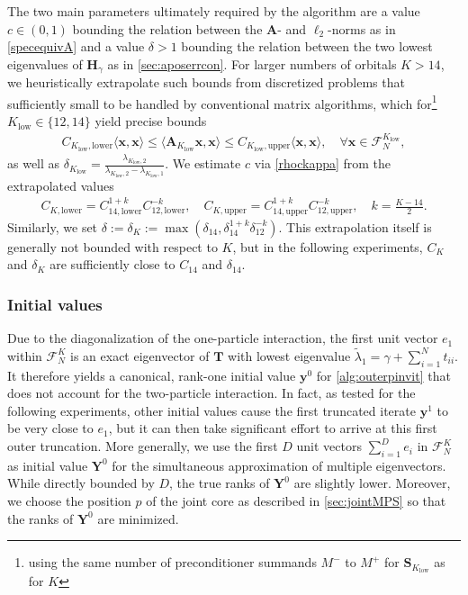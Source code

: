 \documentclass[a4paper,11pt,oneside]{amsart}
\theoremstyle{definition}
\theoremstyle{remark}
\newcommand{\A}{\ten A}
\newcommand{\ten}[1]{\boldsymbol{#1}}
\numberwithin{equation}{section}
\numberwithin{theorem}{section}
\begin{document}
The two main parameters ultimately required by the algorithm are a value $c \in (0,1)$ bounding the relation between the $\A$- and $\ell_2$-norms as in \cref{specequivA} and a value $\delta > 1$ bounding the relation between the two lowest eigenvalues of $\ten H_\gamma$ as in \cref{sec:aposerrcon}. For larger numbers of orbitals $K > 14$, we heuristically extrapolate such bounds from discretized problems that sufficiently small to be handled by conventional matrix algorithms, which for\footnote{using the same number of preconditioner summands $M^-$ to $M^+$ for $\ten S_{K_{\mathrm{low}}}$ as for $K$} $K_{\mathrm{low}} \in \{12,14\}$ yield precise bounds
\begin{align*}
  C_{K_{\mathrm{low}},\mathrm{lower}} \langle   \ten x,  \ten x \rangle
   \leq \langle \A_{K_{\mathrm{low}}}  \ten x , \ten x \rangle 	\leq 
   C_{{K_{\mathrm{low}}},\mathrm{upper}} \langle  \ten x,  \ten x \rangle, \quad \forall \ten x \in \mathcal{F}_N^{K_{\mathrm{low}}},
\end{align*}
as well as $\delta_{K_{\mathrm{low}}} = \frac{\lambda_{{K_{\mathrm{low}}},2}}{\lambda_{{K_{\mathrm{low}}},2} - \lambda_{{K_{\mathrm{low}}},1}}$. We estimate $c$ via \cref{rhockappa} from the extrapolated values
%
%
\begin{align*}
 C_{K,\mathrm{lower}} = C_{14,\mathrm{lower}}^{1+k}  C_{12,\mathrm{lower}}^{-k}, \quad
 C_{K,\mathrm{upper}} = C_{14,\mathrm{upper}}^{1+k} C_{12,\mathrm{upper}}^{-k}, \quad k = \frac{K - 14}{2}.
\end{align*}
Similarly, we set $\delta := \delta_K := \max(\delta_{14},\delta_{14}^{1+k}  \delta_{12}^{-k})$. This extrapolation itself is generally not bounded with respect to $K$, but in the following experiments, $C_{K}$ and $\delta_K$ are sufficiently close to $C_{14}$ and $\delta_{14}$.
%


\subsubsection{Initial values}\label{sec:initvalues}

Due to the diagonalization of the one-particle interaction, the first unit vector $e_1$ within $\mathcal{F}_N^K$ is an exact eigenvector of $\ten T$ with lowest eigenvalue $\tilde{\lambda}_1 = \gamma + \sum_{i = 1}^N t_{ii}$. It therefore yields a canonical, rank-one initial value $\ten y^0$ for \cref{alg:outerpinvit} that does not account for the two-particle interaction. In fact, as tested for the following experiments, other initial values cause the first truncated iterate $\ten y^1$ to be very close to $e_1$, but it can then take significant effort to arrive at this first outer truncation. More generally,  we use the first $D$ unit vectors $\sum_{i = 1}^D e_i$ in $\mathcal{F}_N^K$ as initial value $\ten Y^0$ for the simultaneous approximation of multiple eigenvectors. While directly bounded by $D$, the true ranks of $\ten Y^0$ are slightly lower. Moreover, we choose the position $p$ of the joint core as described in \cref{sec:jointMPS} so that the ranks of $\ten Y^0$ are minimized.
\end{document}
